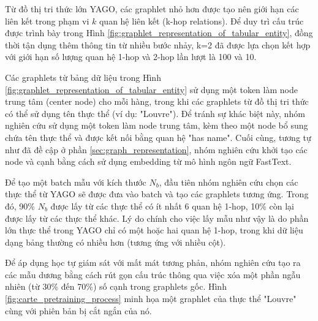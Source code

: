\documentclass{article}
\begin{document}
Từ đồ thị tri thức lớn YAGO, các graphlet nhỏ hơn được tạo nên giới hạn các liên kết trong phạm vi $k$ quan hệ liên kết (k-hop relations). Để duy trì cấu trúc được trình bày trong Hình \ref{fig:graphlet_representation_of_tabular_entity}, đồng thời tận dụng thêm thông tin từ nhiều bước nhảy, k=2 đã được lựa chọn kết hợp với giới hạn số lượng quan hệ 1-hop và 2-hop lần lượt là 100 và 10.

Các graphlets từ bảng dữ liệu trong Hình \ref{fig:graphlet_representation_of_tabular_entity} sử dụng một token làm node trung tâm (center node) cho mỗi hàng, trong khi các graphlets từ đồ thị tri thức có thể sử dụng tên thực thể (ví dụ: "Louvre"). Để tránh sự khác biệt này, nhóm nghiên cứu sử dụng một token làm node trung tâm, kèm theo một node bổ sung chứa tên thực thể và được kết nối bằng quan hệ "has name". Cuối cùng, tương tự như đã đề cập ở phần \ref{sec:graph_representation}, nhóm nghiên cứu khởi tạo các node và cạnh bằng cách sử dụng embedding từ mô hình ngôn ngữ FastText.

Để tạo một batch mẫu với kích thước $N_b$, đầu tiên nhóm nghiên cứu chọn các thực thể từ YAGO sẽ được đưa vào batch và tạo các graphlets tương ứng. Trong đó, 90\% $N_b$ được lấy từ các thực thể có ít nhất 6 quan hệ 1-hop, 10\% còn lại được lấy từ các thực thể khác. Lý do chính cho việc lấy mẫu như vậy là do phần lớn thực thể trong YAGO chỉ có một hoặc hai quan hệ 1-hop, trong khi dữ liệu dạng bảng thường có nhiều hơn (tương ứng với nhiều cột).

Để áp dụng học tự giám sát với mất mát tương phản, nhóm nghiên cứu tạo ra các mẫu dương bằng cách rút gọn cấu trúc thông qua việc xóa một phần ngẫu nhiên (từ 30\% đến 70\%) số cạnh trong graphlets gốc. Hình \ref{fig:carte_pretraining_process} minh họa một graphlet của thực thể "Louvre" cùng với phiên bản bị cắt ngắn của nó.
\end{document}
